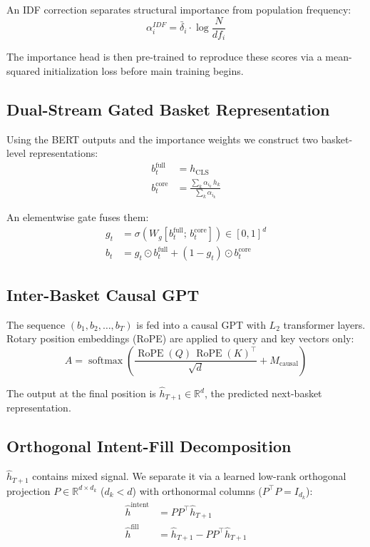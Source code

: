 \documentclass[conference]{IEEEtran}
\begin{document}
An IDF correction separates structural importance from population
frequency:
\begin{equation}
\alpha_i^{IDF} = \bar{\delta}_i \cdot \log\frac{N}{df_i}
\end{equation}

The importance head is then pre-trained to reproduce these scores
via a mean-squared initialization loss before main training begins.

\subsection{Dual-Stream Gated Basket Representation}

Using the BERT outputs and the importance weights we construct two
basket-level representations:
\begin{align}
b_t^{\text{full}} &= h_{\text{CLS}} \\
b_t^{\text{core}} &= \frac{\sum_k \alpha_{i_k}\, h_k}{\sum_k \alpha_{i_k}}
\end{align}

An elementwise gate fuses them:
\begin{align}
g_t &= \sigma\!\left(W_g [b_t^{\text{full}};\, b_t^{\text{core}}]\right) \in [0,1]^d \\
b_t &= g_t \odot b_t^{\text{full}} + (1 - g_t) \odot b_t^{\text{core}}
\end{align}

\subsection{Inter-Basket Causal GPT}

The sequence $(b_1, b_2, \ldots, b_T)$ is fed into a causal GPT with
$L_2$ transformer layers. Rotary position embeddings (RoPE) are applied
to query and key vectors only:
\begin{equation}
A = \operatorname{softmax}\!\left(\frac{\operatorname{RoPE}(Q)\,\operatorname{RoPE}(K)^\top}{\sqrt{d}} + M_{\text{causal}}\right)
\end{equation}

The output at the final position is $\hat{h}_{T+1} \in \mathbb{R}^d$, the predicted
next-basket representation.

\subsection{Orthogonal Intent-Fill Decomposition}

$\hat{h}_{T+1}$ contains mixed signal. We separate it via a learned low-rank orthogonal projection
$P \in \mathbb{R}^{d \times d_k}$ ($d_k < d$) with orthonormal columns
($P^\top P = I_{d_k}$):
\begin{align}
\hat{h}^{\text{intent}} &= PP^\top \hat{h}_{T+1} \\
\hat{h}^{\text{fill}}   &= \hat{h}_{T+1} - PP^\top \hat{h}_{T+1}
\end{align}
\end{document}
